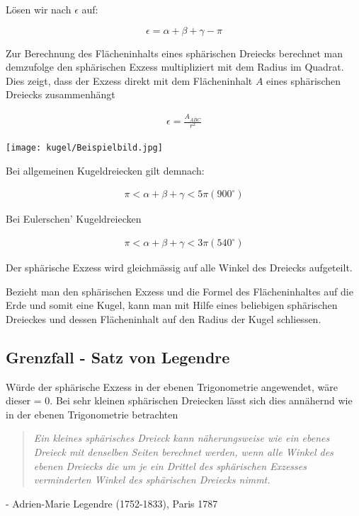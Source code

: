 \begin{refsection}
Lösen wir nach $\epsilon$ auf:

\begin{equation}
\epsilon = \alpha + \beta + \gamma - \pi
\end{equation}

Zur Berechnung des Flächeninhalts eines sphärischen Dreiecks berechnet man demzufolge den sphärischen Exzess multipliziert mit dem Radius im Quadrat.
Dies zeigt, dass der Exzess direkt mit dem Flächeninhalt $A$ eines sphärischen Dreiecks zusammenhängt

\begin{align*}
\epsilon = \frac{A_{ \overline{ ABC }}}{r^2}
\end{align*}

\begin{center}
        \texttt{[image: kugel/Beispielbild.jpg]}
\end{center}

Bei allgemeinen Kugeldreiecken gilt demnach:

\begin{align*}
\pi < \alpha + \beta + \gamma < 5\pi (900^{\circ})
\end{align*}


Bei Eulerschen’ Kugeldreiecken

\begin{align*}
\pi < \alpha + \beta + \gamma < 3\pi (540^{\circ})
\end{align*}

Der sphärische Exzess wird gleichmässig auf alle Winkel des Dreiecks aufgeteilt.

Bezieht man den sphärischen Exzess und die Formel des Flächeninhaltes auf die Erde und somit eine Kugel, kann man mit Hilfe eines beliebigen sphärischen Dreieckes und dessen Flächeninhalt auf den Radius der Kugel schliessen.

\subsection{Grenzfall - Satz von Legendre}

Würde der sphärische Exzess in der ebenen Trigonometrie angewendet, wäre dieser = 0.
Bei sehr kleinen sphärischen Dreiecken lässt sich dies annähernd wie in der ebenen Trigonometrie betrachten

\begin{quote} \textit{Ein kleines sphärisches Dreieck kann näherungsweise 
wie ein ebenes Dreieck mit denselben Seiten berechnet 
werden, wenn alle Winkel des ebenen Dreiecks die um 
je ein Drittel des sphärischen Exzesses verminderten 
Winkel des sphärischen Dreiecks nimmt.} \end{quote}
\begin{flushright} - Adrien-Marie Legendre (1752-1833), Paris 1787
\end{flushright}


\end{refsection}
